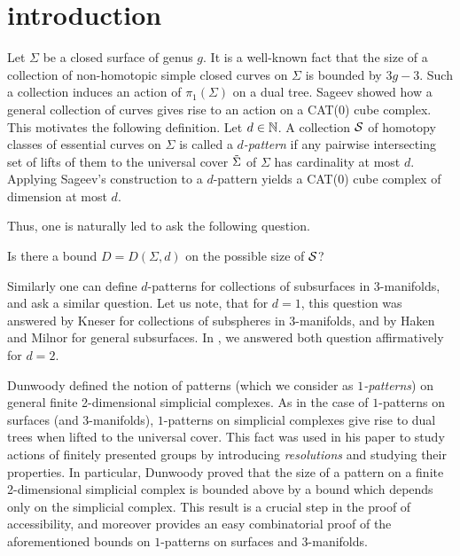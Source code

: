 
\section{introduction}
Let $\Sigma$ be a closed surface of genus $g$. It is a well-known fact that the size of a collection of non-homotopic simple closed curves on $\Sigma$ is bounded by $3g-3$.
Such a collection induces an action of $\pi_1(\Sigma)$ on a dual tree.
Sageev \cite{Sag95} showed how a general collection of curves gives rise to an action on a CAT(0) cube complex. This motivates the following definition.
Let $d\in\mathbb N$. A collection ${\mathcal{S}}$ of homotopy classes of essential curves on $\Sigma$ is called a \emph{$d$-pattern} if any pairwise intersecting set of lifts of them to the universal cover $\tilde{\Sigma}$ of $\Sigma$ has cardinality at most $d$.
Applying Sageev's construction to a $d$-pattern yields a CAT(0) cube complex of dimension at most $d$.





Thus, one is naturally led to ask the following question.

\begin{question}\label{curves on surfaces?}
Is there a bound $D=D(\Sigma,d)$ on the possible size of ${\mathcal{S}}$?
\end{question}

Similarly one can define $d$-patterns for collections of subsurfaces in 3-manifolds, and ask a similar question.
Let us note, that for $d=1$, this question was answered by Kneser \cite{Kne29} for collections of subspheres in 3-manifolds, and by Haken \cite{Hak61} and Milnor \cite{Mil62} for general subsurfaces. In \cite{BeLa16}, we answered both question affirmatively for $d=2$.

Dunwoody \cite{Dun85} defined the notion of patterns (which we consider as \emph{$1$-patterns}) on general finite 2-dimensional simplicial complexes. 
As in the case of $1$-patterns on surfaces (and 3-manifolds), $1$-patterns on simplicial complexes give rise to dual trees when lifted to the universal cover.
This fact was used in his paper to study actions of finitely presented groups by introducing \emph{resolutions} and studying their properties. 
In particular, Dunwoody proved that the size of a pattern on a finite 2-dimensional simplicial complex is bounded above by a bound which depends only on the simplicial complex. 
This result is a crucial step in the proof of accessibility, and moreover provides an easy combinatorial proof of the aforementioned bounds on $1$-patterns on surfaces and 3-manifolds.

